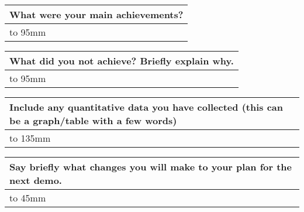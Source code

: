 \documentclass[a4paper]{article}
\newcommand{\colWidth}{141mm}
\begin{document}
\begin{center}

\begin{tabular}{|p{\colWidth}|}
	\hline
	\cellcolor{blue!25}\large
	\textbf{What were your main achievements?}
	\\ \hline
	\vtop to 95mm{
  }
  \\
  \hline
\end{tabular}
\vskip 5mm


\begin{tabular}{|p{\colWidth}|}
	\hline
	\cellcolor{blue!25}\large
	\textbf{What did you not achieve? Briefly explain why.}
	\\ \hline
	\vtop to 95mm{

  }
  \\
  \hline
\end{tabular}
\vskip 5mm


\begin{tabular}{|p{\colWidth}|}
	\hline
	\cellcolor{blue!25}\large
	\textbf{Include any quantitative data you have collected (this can be a graph/table with a few words)}
	\\ \hline
	\vtop to 135mm{

  }
  \\
  \hline
\end{tabular}
\vskip 5mm


\begin{tabular}{|p{\colWidth}|}
	\hline
	\cellcolor{blue!25}\large
	\textbf{Say briefly what changes you will make to your plan for the next demo.}
	\\ \hline
	\vtop to 45mm{

  }
  \\
  \hline
\end{tabular}

\end{center}
  
\end{document}
